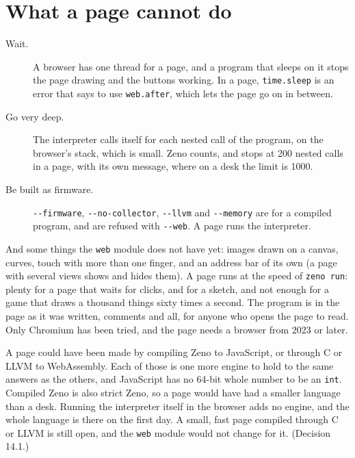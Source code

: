 \section{What a page cannot do}

\begin{description}
\item[Wait.] A browser has one thread for a page, and a program that
  sleeps on it stops the page drawing and the buttons working. In a
  page, \verb|time.sleep| is an error that says to use
  \verb|web.after|, which lets the page go on in between.
\item[Go very deep.] The interpreter calls itself for each nested call
  of the program, on the browser's stack, which is small. Zeno counts,
  and stops at 200 nested calls in a page, with its own message, where
  on a desk the limit is 1000.
\item[Be built as firmware.] \verb|--firmware|, \verb|--no-collector|,
  \verb|--llvm| and \verb|--memory| are for a compiled program, and
  are refused with \verb|--web|. A page runs the interpreter.
\end{description}

And some things the \verb|web| module does not have yet: images drawn
on a canvas, curves, touch with more than one finger, and an address
bar of its own (a page with several views shows and hides them). A
page runs at the speed of \verb|zeno run|: plenty for a page that waits
for clicks, and for a sketch, and not enough for a game that draws a
thousand things sixty times a second. The program is in the page as it
was written, comments and all, for anyone who opens the page to read.
Only Chromium has been tried, and the page needs a browser from 2023
or later.

\begin{why}
A page could have been made by compiling Zeno to JavaScript, or
through C or LLVM to WebAssembly. Each of those is one more engine to
hold to the same answers as the others, and JavaScript has no 64-bit
whole number to be an \verb|int|. Compiled Zeno is also strict Zeno,
so a page would have had a smaller language than a desk. Running the
interpreter itself in the browser adds no engine, and the whole
language is there on the first day. A small, fast page compiled
through C or LLVM is still open, and the \verb|web| module would not
change for it. (Decision 14.1.)
\end{why}

